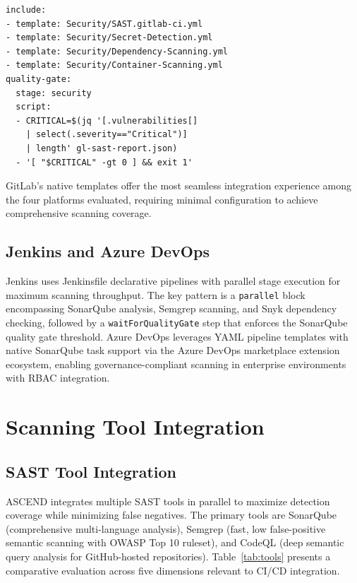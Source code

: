 \documentclass[journal]{IEEEtran}
\begin{document}
{\scriptsize
\begin{verbatim}
include:
- template: Security/SAST.gitlab-ci.yml
- template: Security/Secret-Detection.yml
- template: Security/Dependency-Scanning.yml
- template: Security/Container-Scanning.yml
quality-gate:
  stage: security
  script:
  - CRITICAL=$(jq '[.vulnerabilities[]
    | select(.severity=="Critical")]
    | length' gl-sast-report.json)
  - '[ "$CRITICAL" -gt 0 ] && exit 1'
\end{verbatim}
}

GitLab's native templates offer the most seamless integration experience among the four platforms evaluated, requiring minimal configuration to achieve comprehensive scanning coverage.

\subsection{Jenkins and Azure DevOps}

Jenkins uses Jenkinsfile declarative pipelines with parallel stage execution for maximum scanning throughput. The key pattern is a \texttt{parallel} block encompassing SonarQube analysis, Semgrep scanning, and Snyk dependency checking, followed by a \texttt{waitForQualityGate} step that enforces the SonarQube quality gate threshold. Azure DevOps leverages YAML pipeline templates with native SonarQube task support via the Azure DevOps marketplace extension ecosystem, enabling governance-compliant scanning in enterprise environments with RBAC integration.

\section{Scanning Tool Integration}
\label{sec:tools}

\subsection{SAST Tool Integration}

ASCEND integrates multiple SAST tools in parallel to maximize detection coverage while minimizing false negatives. The primary tools are SonarQube (comprehensive multi-language analysis), Semgrep (fast, low false-positive semantic scanning with OWASP Top 10 ruleset), and CodeQL (deep semantic query analysis for GitHub-hosted repositories). Table~\ref{tab:tools} presents a comparative evaluation across five dimensions relevant to CI/CD integration.
\end{document}
